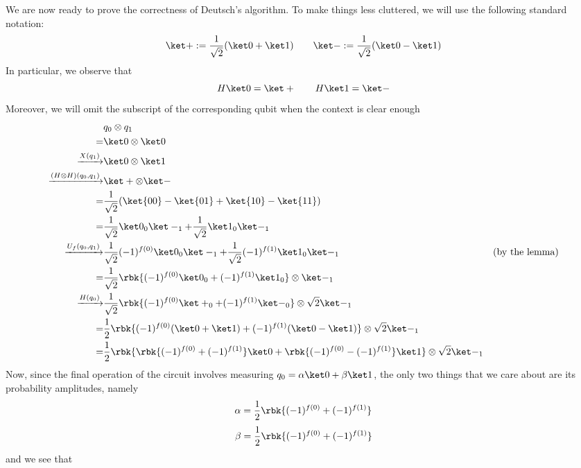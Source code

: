 \documentclass[a4paper, 12pt]{report}
\begin{document}
We are now ready to prove the correctness of Deutsch's algorithm. To make things less cluttered, we will use the following standard notation: $$\ket + := \dfrac{1}{\sqrt 2}(\ket 0 + \ket 1) \quad \quad \ket - := \dfrac{1}{\sqrt 2}(\ket 0 - \ket 1)$$ In particular, we observe that $$H \ket 0 = \ket + \quad \quad H \ket 1 = \ket - $$ Moreover, we will omit the subscript of the corresponding qubit when the context is clear enough
\begin{equation*}
    \begin{alignedat}{2}
      & q_0 \otimes q_1 &  \\ 
        = & \ket 0 \otimes \ket 0 & \\ 
        \xrightarrow{X(q_1)} & \ket 0 \otimes \ket 1 & \\ 
        \xrightarrow{(H \otimes H)(q_0, q_1)} & \ket + \otimes \ket - &  \\ 
        = & \dfrac{1}{\sqrt 2}(\ket{00} - \ket{01} + \ket{10} - \ket{11}) & \\ 
        = & \dfrac{1}{\sqrt 2} \ket 0_0 \ket -_1  + \dfrac{1}{\sqrt 2} \ket 1_0 \ket -_1 & \\ 
        \xrightarrow{U_f(q_0, q_1)} & \dfrac{1}{\sqrt 2} (-1)^{f(0)} \ket 0_0 \ket -_1 + \dfrac{1}{\sqrt 2} (-1)^{f(1)} \ket 1_0 \ket -_1 & \quad (\mbox{by the lemma}) \\ 
        = & \dfrac{1}{\sqrt 2}\rbk{(-1)^{f(0)} \ket 0_0 + (-1)^{f(1)} \ket 1_0} \otimes \ket -_1 & \\ 
        \xrightarrow{H(q_0)} & \dfrac{1}{\sqrt 2}\rbk{(-1)^{f(0)} \ket +_0 + (-1)^{f(1)} \ket -_0} \otimes \sqrt 2 \ket -_1 & \\ 
        = & \dfrac{1}{2} \rbk{(-1)^{f(0)}(\ket 0 + \ket 1) + (-1)^{f(1)}(\ket 0 - \ket 1)} \otimes \sqrt 2 \ket -_1 & \\ 
        = & \dfrac{1}{2}\rbk{\rbk{(-1)^{f(0)} + (-1)^{f(1)}} \ket 0 + \rbk{(-1)^{f(0)} - (-1)^{f(1)}} \ket 1} \otimes \sqrt 2 \ket -_1 & \\ 
    \end{alignedat}
\end{equation*}
Now, since the final operation of the circuit involves measuring $q_0 = \alpha \ket 0 + \beta \ket 1$, the only two things that we care about are its probability amplitudes, namely $$\alpha = \dfrac{1}{2}\rbk{(-1)^{f(0)} + (-1)^{f(1)}}$$ $$\beta = \dfrac{1}{2}\rbk{(-1)^{f(0)} + (-1)^{f(1)}}$$ and we see that
\end{document}
